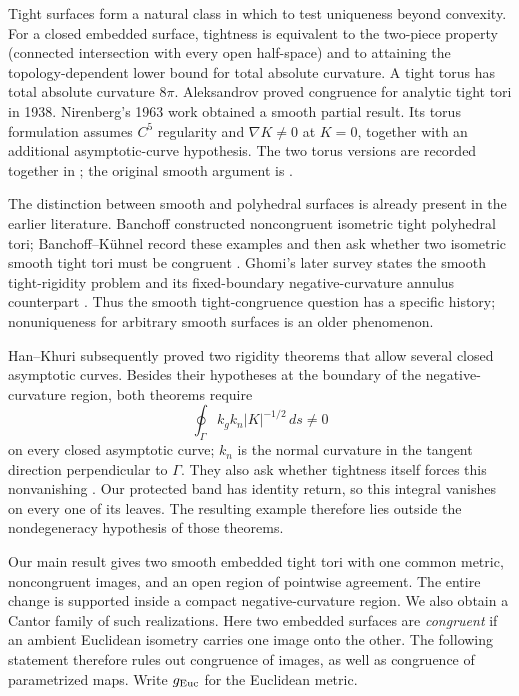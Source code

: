 \documentclass[11pt]{amsart}
\theoremstyle{definition}
\theoremstyle{remark}
\numberwithin{equation}{section}
\begin{document}
Tight surfaces form a natural class in which to test uniqueness beyond
convexity. For a closed embedded surface, tightness is equivalent to the
two-piece property (connected intersection with every open half-space)
and to attaining the topology-dependent lower bound
for total absolute curvature. A tight torus has total absolute curvature
$8\pi$. Aleksandrov proved congruence for analytic tight tori
in 1938. Nirenberg's 1963 work obtained a smooth partial result.
Its torus formulation assumes $C^5$ regularity and $\nabla K\ne0$ at
$K=0$, together with an additional asymptotic-curve hypothesis. The two
torus versions are recorded together in \cite[Theorem~1.6.1]{BK}; the original
smooth argument is \cite{Nirenberg}.

The distinction between smooth and polyhedral surfaces is already
present in the earlier literature. Banchoff constructed noncongruent
isometric tight polyhedral tori; Banchoff--K\"uhnel record these examples
and then ask whether two isometric smooth tight tori must be congruent
\cite[Example~1.6.2 and Question~11]{BK}. Ghomi's later survey states
the smooth tight-rigidity problem and its fixed-boundary
negative-curvature annulus counterpart \cite[Problems~1.2--1.3]{GhomiProblems}.
Thus the smooth tight-congruence question has a specific history;
nonuniqueness for arbitrary smooth surfaces is an older phenomenon.

Han--Khuri subsequently proved two rigidity theorems that allow several
closed asymptotic curves. Besides their hypotheses at the boundary of
the negative-curvature region, both theorems require
\[
 \oint_\Gamma k_gk_n|K|^{-1/2}\,ds\ne0
\]
on every closed asymptotic curve; $k_n$ is the normal curvature in the
tangent direction perpendicular to $\Gamma$. They also ask whether
tightness itself forces this nonvanishing \cite[Theorems~1--2 and the
following remark]{HK}. Our protected band has identity return, so this
integral vanishes on every one of its leaves. The resulting example
therefore lies outside the nondegeneracy hypothesis of those theorems.

Our main result gives two smooth embedded tight tori with one common
metric, noncongruent images, and an open region of pointwise agreement.
The entire change is supported inside a compact negative-curvature
region. We also obtain a Cantor family of such realizations.
Here two embedded surfaces are \emph{congruent} if an ambient Euclidean
isometry carries one image onto the other. The following statement therefore
rules out congruence of images, as well as congruence of parametrized maps.
Write $g_{\rm Euc}$ for the Euclidean metric.
\end{document}
